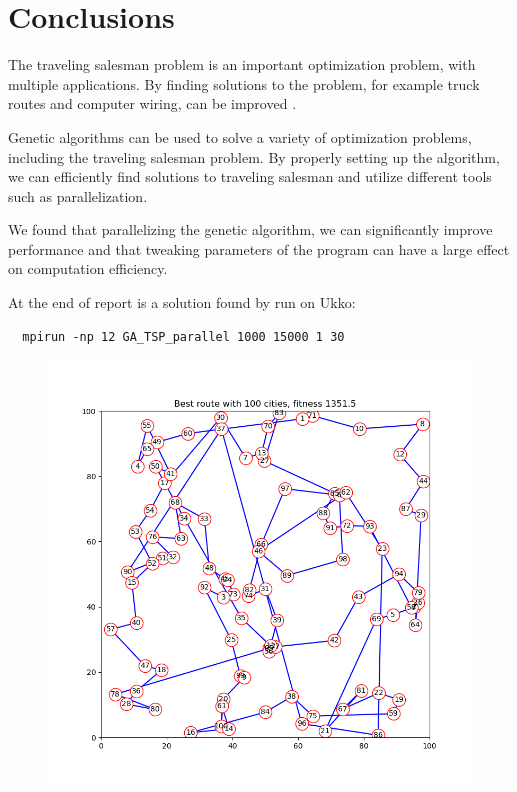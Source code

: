 \documentclass[12pt]{article}
\begin{document}
\section{Conclusions}

The traveling salesman problem is an important optimization problem, with multiple applications.
By finding solutions to the problem, for example truck routes and computer wiring, can be improved
\cite{Bryant}.

Genetic algorithms can be used to solve a variety of optimization problems, including the traveling
salesman problem. By properly setting up the algorithm, we can efficiently find solutions to
traveling salesman and utilize different tools such as parallelization.

We found that parallelizing the genetic algorithm, we can significantly improve performance and
that tweaking parameters of the program can have a large effect on computation efficiency.

At the end of report is a solution found by run on Ukko:
\begin{lstlisting}
  mpirun -np 12 GA_TSP_parallel 1000 15000 1 30
\end{lstlisting}

\begin{figure}[h]
  \includegraphics[scale=0.7]{best_chromosome100plot.png}
\end{figure}







\end{document}
